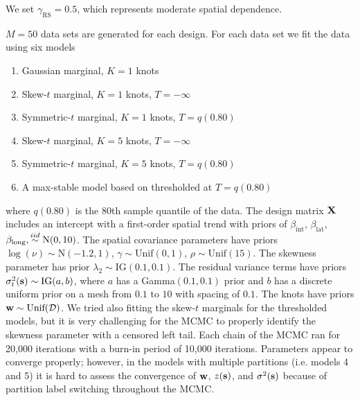 \documentclass[useAMS,usenatbib,referee]{biom}
\begin{document}
We set $\gamma_{\text{RS}} = 0.5$, which represents moderate spatial dependence.

$M = 50$ data sets are generated for each design.
For each data set we fit the data using six models
 \begin{enumerate} [leftmargin=3em]
  \item Gaussian marginal, $K=1$ knots
  \item Skew-$t$ marginal, $K=1$ knots, $T=-\infty$
  \item Symmetric-$t$ marginal, $K=1$ knots, $T=q(0.80)$
  \item Skew-$t$ marginal, $K=5$ knots, $T=-\infty$
  \item Symmetric-$t$ marginal, $K=5$ knots, $T=q(0.80)$
  \item A max-stable model based on \citet{Reich2012} thresholded at $T = q(0.80)$
 \end{enumerate} 
where $q(0.80)$ is the 80th sample quantile of the data.
The design matrix $\mbox{\bf X}$ includes an intercept with a first-order spatial trend with priors of $\beta_\text{int}$, $\beta_\text{lat}$, $\beta_\text{long},  \stackrel{iid}{\sim} \text{N}(0, 10)$.
The spatial covariance parameters have priors $\log(\nu) \sim \text{N}(-1.2, 1)$, $\gamma \sim \text{Unif}(0, 1)$, $\rho \sim \text{Unif}(15)$.
The skewness parameter has prior $\lambda_2 \sim \text{IG}(0.1, 0.1)$.
The residual variance terms have priors $\sigma^2_t(\mbox{\bf s}) \sim \text{IG}(a, b)$, where $a$ has a Gamma$(0.1, 0.1)$ prior and $b$ has a discrete uniform prior on a mesh from $0.1$ to $10$ with spacing of $0.1$.
The knots have priors $\bw \sim \text{Unif}(\calD)$.
We tried also fitting the skew-$t$ marginals for the thresholded models, but it is very challenging for the MCMC to properly identify the skewness parameter with a censored left tail.
Each chain of the MCMC ran for 20,000 iterations with a burn-in period of 10,000 iterations.
Parameters appear to converge properly; however, in the models with multiple partitions (i.e. models 4 and 5) it is hard to assess the convergence of $\mbox{\bf w}$, $z(\mbox{\bf s})$, and $\sigma^2(\mbox{\bf s})$ because of partition label switching throughout the MCMC.
\end{document}
